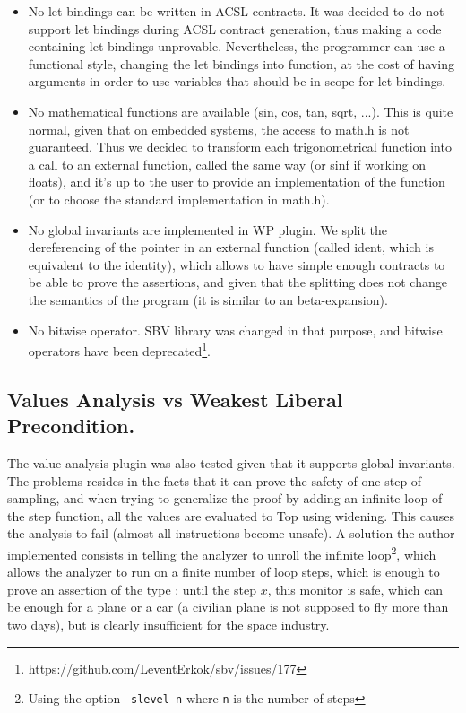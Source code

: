 \documentclass[a4paper,11pt,final]{article}
\begin{document}
  \begin{itemize}
  	\item No let bindings can be written in ACSL contracts.
  	\subitem It was decided to do not support let bindings during ACSL contract generation, thus making a code containing let bindings unprovable. Nevertheless, the programmer can use a functional style, changing the let bindings into function, at the cost of having arguments in order to use variables that should be in scope for let bindings.
  	\item No mathematical functions are available (sin, cos, tan, sqrt, ...).
  	\subitem This is quite normal, given that on embedded systems, the access to math.h is not guaranteed. Thus we decided to transform each trigonometrical function into a call to an external function, called the same way (or sinf if working on floats), and it's up to the user to provide an implementation of the function (or to choose the standard implementation in math.h).
  	\item No global invariants are implemented in WP plugin.
  	\subitem We split the dereferencing of the pointer in an external function (called ident, which is equivalent to the identity), which allows to have simple enough contracts to be able to prove the assertions, and given that the splitting does not change the semantics of the program (it is similar to an beta-expansion).
  	\item No bitwise operator.
  	\subitem SBV library was changed in that purpose, and bitwise operators have been deprecated\footnote{https://github.com/LeventErkok/sbv/issues/177}.
  \end{itemize}
  
  \subsection{Values Analysis vs Weakest Liberal Precondition.}
  The value analysis plugin was also tested given that it supports global invariants. The problems resides in the facts that it can prove the safety of one step of sampling, and when trying to generalize the proof by adding an infinite loop of the step function, all the values are evaluated to Top using widening. This causes the analysis to fail (almost all instructions become unsafe). A solution the author implemented consists in telling the analyzer to unroll the infinite loop\footnote{Using the option \texttt{-slevel n} where \texttt{n} is the number of steps}, which allows the analyzer to run on a finite number of loop steps, which is enough to prove an assertion of the type : until the step $x$, this monitor is safe, which can be enough for a plane or a car (a civilian plane is not supposed to fly more than two days), but is clearly insufficient for the space industry.
  
\end{document}
